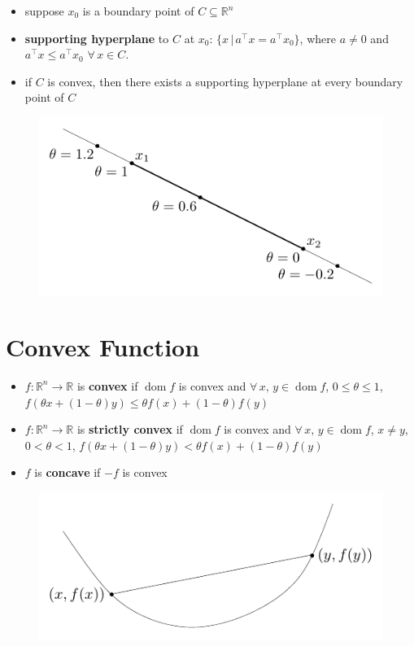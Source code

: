 \documentclass[11pt]{extarticle}
\newcommand{\ds}{\displaystyle}
\DeclareMathOperator*{\dom}{dom}
\theoremstyle{definition}
\begin{document}
\begin{itemize}
  \item suppose $x_0$ is a boundary point of $C\subseteq\mathbb{R}^n$
  \item {\bf supporting hyperplane} to $C$ at $x_0$: $\{x\,|\,a^\top x = a^\top x_0\}$, where $a\ne 0$ and $a^\top x\leqslant a^\top x_0$ $\forall\,x\in C$. 
  \item if $C$ is convex, then there exists a supporting hyperplane at every boundary point of $C$ 
\end{itemize}
\vspace{-10mm}
\begin{figure}[!htbp]
  \centering
  \includegraphics[scale=0.91,page=21]{fig/02.pdf}
\end{figure}

\newpage

\section*{Convex Function}

\begin{itemize}
  \item $f:\mathbb{R}^n\to\mathbb{R}$ is {\bf convex} if $\dom f$ is convex and $\forall\,x,\,y\in\dom f$, $0\leqslant\theta\leqslant 1$, $\ds f(\theta x + (1 - \theta)y)\leqslant\theta f(x) + (1 - \theta) f(y)$
  \item $f:\mathbb{R}^n\to\mathbb{R}$ is {\bf strictly convex} if $\dom f$ is convex and $\forall\,x,\,y\in\dom f$, $x\ne y$, $0 < \theta < 1$, $\ds f(\theta x + (1 - \theta)y) < \theta f(x) + (1 - \theta) f(y)$
  \item $f$ is {\bf concave} if $-f$ is convex
\end{itemize}
\vspace{-1em}
\begin{figure}[!htbp]
  \centering
  \includegraphics[scale=1,page=1]{fig/03.pdf}
\end{figure}
\end{document}
